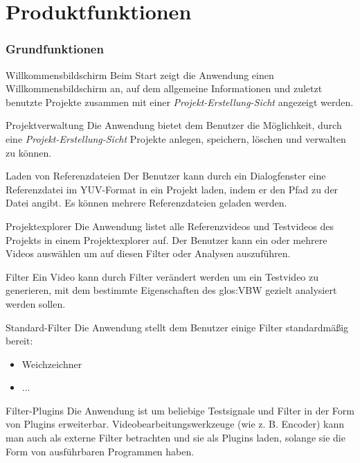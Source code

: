 \chapter {Produktfunktionen}

\subsection{Grundfunktionen}
\setcounter{counterKriterien}{0}
 Willkommensbildschirm
\newline
Beim Start zeigt die Anwendung einen Willkommensbildschirm an, auf dem allgemeine Informationen und zuletzt benutzte Projekte zusammen mit einer \emph{Projekt-Erstellung-Sicht} angezeigt werden.

 Projektverwaltung
\newline
Die Anwendung bietet dem Benutzer die Möglichkeit, durch eine \emph{Projekt-Erstellung-Sicht} Projekte anlegen, speichern, löschen und verwalten zu können.

 Laden von Referenzdateien
\newline
Der Benutzer kann durch ein Dialogfenster eine Referenzdatei im YUV-Format in ein Projekt laden, indem er den Pfad zu der Datei angibt. Es können mehrere Referenzdateien geladen werden.

 Projektexplorer
\newline
Die Anwendung listet alle Referenzvideos und Testvideos des Projekts in einem Projektexplorer auf. Der Benutzer kann ein oder mehrere Videos auswählen um auf diesen Filter oder Analysen auszuführen.



 Filter
\newline
Ein Video kann durch Filter verändert werden um ein Testvideo zu generieren, mit dem bestimmte Eigenschaften des \gls{glos:VBW} gezielt analysiert werden sollen.

 Standard-Filter
\newline
Die Anwendung stellt dem Benutzer einige Filter standardmäßig bereit:
\begin{itemize}
\item Weichzeichner
\item ...
\end{itemize}

 Filter-Plugins
\newline
Die Anwendung ist um beliebige Testsignale und Filter in der Form von Plugins erweiterbar. Videobearbeitungswerkzeuge (wie z. B. Encoder) kann man auch als externe Filter betrachten und sie als Plugins laden, solange sie die Form von ausführbaren Programmen haben.


